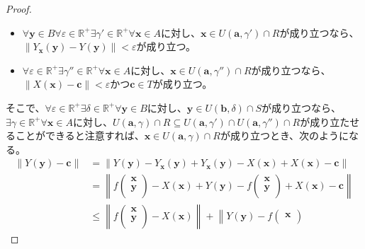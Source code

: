 \documentclass[dvipdfmx]{jsarticle}
\begin{document}
\begin{proof}
\begin{itemize}
\item
  $\forall\mathbf{y} \in B\forall\varepsilon \in \mathbb{R}^{+}\exists\gamma' \in \mathbb{R}^{+}\forall\mathbf{x} \in A$に対し、$\mathbf{x} \in U\left( \mathbf{a},\gamma' \right) \cap R$が成り立つなら、$\left\| Y_{\mathbf{x}}\left( \mathbf{y} \right) - Y\left( \mathbf{y} \right) \right\| < \varepsilon$が成り立つ。
\item
  $\forall\varepsilon \in \mathbb{R}^{+}\exists\gamma'' \in \mathbb{R}^{+}\forall\mathbf{x} \in A$に対し、$\mathbf{x} \in U\left( \mathbf{a},\gamma'' \right) \cap R$が成り立つなら、$\left\| X\left( \mathbf{x} \right) - \mathbf{c} \right\| < \varepsilon$かつ$\mathbf{c} \in T$が成り立つ。
\end{itemize}
そこで、$\forall\varepsilon \in \mathbb{R}^{+}\exists\delta \in \mathbb{R}^{+}\forall\mathbf{y} \in B$に対し、$\mathbf{y} \in U\left( \mathbf{b},\delta \right) \cap S$が成り立つなら、$\exists\gamma \in \mathbb{R}^{+}\forall\mathbf{x} \in A$に対し、$U\left( \mathbf{a},\gamma \right) \cap R \subseteq U\left( \mathbf{a},\gamma' \right) \cap U\left( \mathbf{a},\gamma'' \right) \cap R$が成り立たせることができると注意すれば、$\mathbf{x} \in U\left( \mathbf{a},\gamma \right) \cap R$が成り立つとき、次のようになる。
\begin{align*}
\left\| Y\left( \mathbf{y} \right) - \mathbf{c} \right\| &= \left\| Y\left( \mathbf{y} \right) - Y_{\mathbf{x}}\left( \mathbf{y} \right) + Y_{\mathbf{x}}\left( \mathbf{y} \right) - X\left( \mathbf{x} \right) + X\left( \mathbf{x} \right) - \mathbf{c} \right\|\\
&= \left\| f\begin{pmatrix}
\mathbf{x} \\
\mathbf{y} \\
\end{pmatrix} - X\left( \mathbf{x} \right) + Y\left( \mathbf{y} \right) - f\begin{pmatrix}
\mathbf{x} \\
\mathbf{y} \\
\end{pmatrix} + X\left( \mathbf{x} \right) - \mathbf{c} \right\|\\
&\leq \left\| f\begin{pmatrix}
\mathbf{x} \\
\mathbf{y} \\
\end{pmatrix} - X\left( \mathbf{x} \right) \right\| + \left\| Y\left( \mathbf{y} \right) - f\begin{pmatrix}
\mathbf{x} \\

\end{pmatrix}
\end{align*}
\end{proof}
\end{document}
